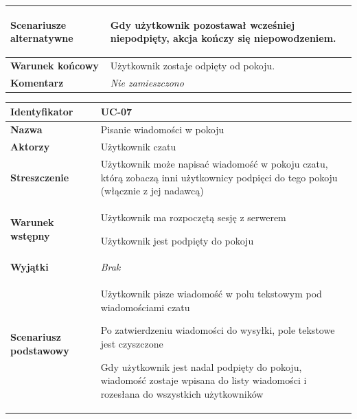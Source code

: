 {\begin{tabular}{ | l | l | }
	\hline
		\parbox[t]{4cm}{\textbf{Scenariusze alternatywne}} & \parbox[t]
		{11cm}{
			\begin{enumreq}
				\item Gdy użytkownik pozostawał wcześniej niepodpięty, akcja
				kończy się niepowodzeniem.
			\end{enumreq}
		}
		\\
		
	\hline
		\parbox[t]{4cm}{\textbf{Warunek końcowy}} & \parbox[t]{11cm}{
			Użytkownik zostaje odpięty od pokoju.
		}
		\\
		
	\hline
		\parbox[t]{4cm}{\textbf{Komentarz}} & \parbox[t]{11cm}{
			\textit{Nie zamieszczono}
		}
		\\

	\hline
\end{tabular}

\vspace{2em}

\begin{tabular}{ | l | l | }
	\hline
		\textbf{Identyfikator} & 
		UC-07
		\\
		
	\hline
		\textbf{Nazwa} & 
		Pisanie wiadomości w pokoju
		\\
		
	\hline
		\textbf{Aktorzy} & \parbox[t]{11cm}{
			Użytkownik czatu
		}\\
		 
	\hline
		\parbox[t]{4cm}{\textbf{Streszczenie}} & \parbox[t]{11cm}{
			Użytkownik może napisać wiadomość w pokoju czatu, którą zobaczą
			inni użytkownicy podpięci do tego pokoju (włącznie z jej nadawcą)	
		}\\
		
	\hline
		\parbox[t]{4cm}{\textbf{Warunek wstępny}} & \parbox[t]{11cm}{
			\begin{enumreq}
				\item Użytkownik ma rozpoczętą sesję z serwerem
				\item Użytkownik jest podpięty do pokoju
			\end{enumreq}
				
		}
		\\
		
	\hline
		\parbox[t]{4cm}{\textbf{Wyjątki}} & \parbox[t]{11cm}{
			\textit{Brak}
			
		}
		\\

	\hline
		\parbox[t]{4cm}{\textbf{Scenariusz podstawowy}} & \parbox[t]{11cm}{
			\begin{enumreq}
				\item Użytkownik pisze wiadomość w polu tekstowym
				pod wiadomościami czatu
				\item Po zatwierdzeniu wiadomości do wysyłki, pole tekstowe
				jest czyszczone
				\item Gdy użytkownik jest nadal podpięty do pokoju, wiadomość
				zostaje wpisana do listy wiadomości i rozesłana do wszystkich
				użytkowników
			\end{enumreq}
		}
		\\
		

\end{tabular}}
